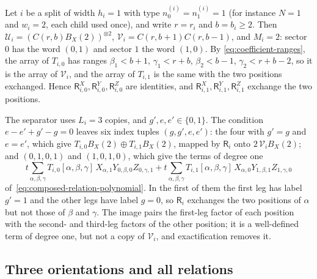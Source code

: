 \begin{example}\label{ex:two-positions}
Let \(i\) be a split of width \(h_i=1\) with type
\(n^{(i)}_0=n^{(i)}_1=1\) (for instance \(N=1\) and \(w_i=2\), each child
used once), and write \(r=r_i\) and \(b=b_i\ge2\). Then
\(\mathcal U_i=(C(r,b)B_X(2))^{\otimes2}\),
\(\mathcal V_i=C(r,b+1)C(r,b-1)\), and \(M_i=2\): sector \(0\) has the
word \((0,1)\) and sector \(1\) the word \((1,0)\). By
\eqref{eq:coefficient-ranges}, the array of \(T_{i,0}\) has ranges
\(\beta_1<b+1\), \(\gamma_1<r+b\), \(\beta_2<b-1\), \(\gamma_2<r+b-2\), so
it is the array of \(\mathcal V_i\), and the array of \(T_{i,1}\) is the
same with the two positions exchanged. Hence
\(\mathsf R^X_{i,0},\mathsf R^Y_{i,0},\mathsf R^Z_{i,0}\) are identities,
and \(\mathsf R^X_{i,1},\mathsf R^Y_{i,1},\mathsf R^Z_{i,1}\) exchange the
two positions.

The separator uses \(L_i=3\) copies, and \(g',e,e'\in\{0,1\}\). The
condition \(e-e'+g'-g=0\) leaves six index tuples \((g,g',e,e')\): the
four with \(g'=g\) and \(e=e'\), which give
\(T_{i,0}B_X(2)\oplus T_{i,1}B_X(2)\), mapped by \(\mathsf R_i\) onto
\(2\,\mathcal V_iB_X(2)\); and \((0,1,0,1)\) and \((1,0,1,0)\), which give
the terms of degree one
\[
 t\sum_{\alpha,\beta,\gamma}T_{i,0}[\alpha,\beta,\gamma]\,
   X_{\alpha,1}Y_{0,\beta,0}Z_{0,\gamma,1}
 +t\sum_{\alpha,\beta,\gamma}T_{i,1}[\alpha,\beta,\gamma]\,
   X_{\alpha,0}Y_{1,\beta,1}Z_{1,\gamma,0}
\]
of~\eqref{eq:composed-relation-polynomial}. In the first of them the first
leg has label \(g'=1\) and the other legs have label \(g=0\), so
\(\mathsf R_i\) exchanges the two positions of \(\alpha\) but not those of
\(\beta\) and \(\gamma\). The image pairs the first-leg factor of each
position with the second- and third-leg factors of the other position; it
is a well-defined term of degree one, but not a copy of \(\mathcal V_i\),
and exactification removes it.
\end{example}

\subsection{Three orientations and all relations}
\label{subsec:composed-orientations}


